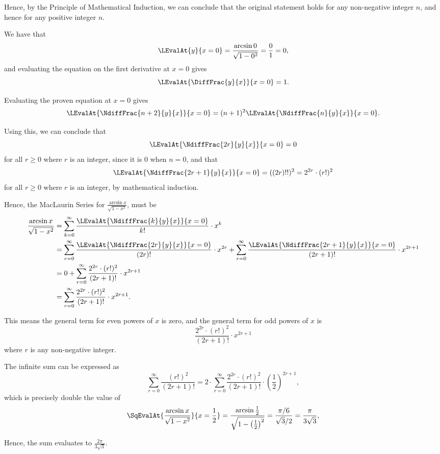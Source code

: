 Hence, by the Principle of Mathematical Induction, we can conclude that the original statement holds for any non-negative integer \(n\), and hence for any positive integer \(n\).

We have that
\[
    \LEvalAt{y}{x = 0} = \frac{\arcsin 0}{\sqrt{1 - 0^2}} = \frac{0}{1} = 0,
\]
and evaluating the equation on the first derivative at \(x = 0\) gives
\[
    \LEvalAt{\DiffFrac{y}{x}}{x = 0} = 1.
\]

Evaluating the proven equation at \(x = 0\) gives
\[
    \LEvalAt{\NdiffFrac{n + 2}{y}{x}}{x = 0} = (n + 1)^2 \LEvalAt{\NdiffFrac{n}{y}{x}}{x = 0}.
\]

Using this, we can conclude that
\[
    \LEvalAt{\NdiffFrac{2r}{y}{x}}{x = 0} = 0
\]
for all \(r \geq 0\) where \(r\) is an integer, since it is \(0\) when \(n = 0\), and that
\[
    \LEvalAt{\NdiffFrac{2r + 1}{y}{x}}{x = 0} = ((2r)!!)^2 = 2^{2r} \cdot (r!)^2
\]
for all \(r \geq 0\) where \(r\) is an integer, by mathematical induction.

Hence, the MacLaurin Series for \(\frac{\arcsin x}{\sqrt{1 - x^2}}\), must be
\begin{align*}
    \frac{\arcsin x}{\sqrt{1 - x^2}} & = \sum_{k = 0}^{\infty} \frac{\LEvalAt{\NdiffFrac{k}{y}{x}}{x = 0}}{k!} \cdot x^k                                                                                                             \\
                                     & = \sum_{r = 0}^{\infty} \frac{\LEvalAt{\NdiffFrac{2r}{y}{x}}{x = 0}}{(2r)!} \cdot x^{2r} + \sum_{r = 0}^{\infty} \frac{\LEvalAt{\NdiffFrac{2r + 1}{y}{x}}{x = 0}}{(2r + 1)!} \cdot x^{2r + 1} \\
                                     & = 0 + \sum_{r = 0}^{\infty} \frac{2^{2r} \cdot (r!)^2}{(2r + 1)!} \cdot x^{2r + 1}                                                                                                            \\
                                     & = \sum_{r = 0}^{\infty} \frac{2^{2r} \cdot (r!)^2}{(2r + 1)!} \cdot x^{2r + 1}.
\end{align*}

This means the general term for even powers of \(x\) is zero, and the general term for odd powers of \(x\) is
\[
    \frac{2^{2r} \cdot (r!)^2}{(2r + 1)!} \cdot x^{2r + 1}
\]
where \(r\) is any non-negative integer.

The infinite sum can be expressed as
\[
    \sum_{r = 0}^{\infty} \frac{(r!)^2}{(2r + 1)!} = 2 \cdot \sum_{r = 0}^{\infty} \frac{2^{2r} \cdot (r!)^2}{(2r + 1)!} \cdot \left(\frac{1}{2}\right)^{2r+1},
\]
which is precisely double the value of
\[
    \SqEvalAt{\frac{\arcsin x}{\sqrt{1 - x^2}}}{x = \frac{1}{2}} = \frac{\arcsin \frac{1}{2}}{\sqrt{1 - \left(\frac{1}{2}\right)^2}} = \frac{\pi / 6}{\sqrt{3} / 2} = \frac{\pi}{3 \sqrt{3}},
\]

Hence, the sum evaluates to \(\frac{2\pi}{3 \sqrt{3}}\).